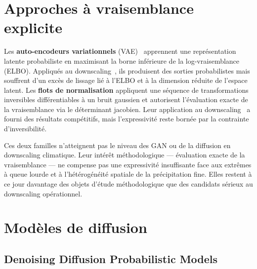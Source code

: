 \documentclass[14pt,a4paper,openany]{extreport}
\theoremstyle{definition}
\begin{document}
\section{Approches à vraisemblance explicite}
\label{sec:soa-vrai}

Les \textbf{auto-encodeurs variationnels} (VAE)~\cite{kingma_vae_2014} apprennent une représentation latente probabiliste en maximisant la borne inférieure de la log-vraisemblance (ELBO). Appliqués au downscaling~\cite{lange_vae_2022}, ils produisent des sorties probabilistes mais souffrent d'un excès de lissage lié à l'ELBO et à la dimension réduite de l'espace latent. Les \textbf{flots de normalisation} appliquent une séquence de transformations inversibles différentiables à un bruit gaussien et autorisent l'évaluation exacte de la vraisemblance via le déterminant jacobien. Leur application au downscaling~\cite{groenke_flow_2020} a fourni des résultats compétitifs, mais l'expressivité reste bornée par la contrainte d'inversibilité.

Ces deux familles n'atteignent pas le niveau des GAN ou de la diffusion en downscaling climatique. Leur intérêt méthodologique --- évaluation exacte de la vraisemblance --- ne compense pas une expressivité insuffisante face aux extrêmes à queue lourde et à l'hétérogénéité spatiale de la précipitation fine. Elles restent à ce jour davantage des objets d'étude méthodologique que des candidats sérieux au downscaling opérationnel.\label{ssec:soa-vae}\label{ssec:soa-flow}\label{ssec:soa-vrai-bilan}

\section{Modèles de diffusion}
\label{sec:soa-diff}

\subsection{Denoising Diffusion Probabilistic Models}
\label{ssec:soa-ddpm}
\end{document}
